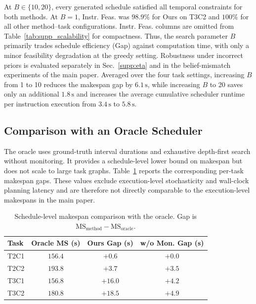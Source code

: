 \documentclass[letterpaper,10pt,onecolumn]{IEEEtran}
\begin{document}
At $B \in \{10,20\}$, every generated schedule satisfied all temporal constraints for both methods. At $B=1$, Instr. Feas. was $98.9\%$ for Ours on T3C2 and $100\%$ for all other method--task configurations. Instr. Feas. columns are omitted from Table~\ref{tab:supp_scalability} for compactness. Thus, the search parameter $B$ primarily trades schedule efficiency (Gap) against computation time, with only a minor feasibility degradation at the greedy setting. Robustness under incorrect priors is evaluated separately in Sec.~\ref{supp:eta} and in the belief-mismatch experiments of the main paper. Averaged over the four task settings, increasing $B$ from 1 to 10 reduces the makespan gap by $6.1\,\mathrm{s}$, while increasing $B$ to 20 saves only an additional $1.8\,\mathrm{s}$ and increases the average cumulative scheduler runtime per instruction execution from $3.4\,\mathrm{s}$ to $5.8\,\mathrm{s}$.

\subsection{Comparison with an Oracle Scheduler}\label{supp:oracle}

The oracle uses ground-truth interval durations and exhaustive
depth-first search without monitoring. It provides a schedule-level lower
bound on makespan but does not scale to large task graphs.
Table~\ref{tab:supp_oracle} reports the corresponding per-task makespan
gaps. These values exclude execution-level stochasticity and wall-clock
planning latency and are therefore not directly comparable to the
execution-level makespans in the main paper.

\begin{table}[H]
\centering
\caption{Schedule-level makespan comparison with the oracle.
Gap is $\mathrm{MS}_{\mathrm{method}}-\mathrm{MS}_{\mathrm{oracle}}$.}
\label{tab:supp_oracle}
{\small
\begin{tabular}{@{}lccc@{}}
\toprule
\textbf{Task} & \textbf{Oracle MS (s)} & \textbf{Ours Gap (s)} & \textbf{w/o Mon. Gap (s)} \\
\midrule
T2C1 & $156.4$ & $+0.6$ & $+0.0$ \\
T2C2 & $193.8$ & $+3.7$ & $+3.5$ \\
T3C1 & $156.8$ & $+16.0$ & $+4.2$ \\
T3C2 & $180.8$ & $+18.5$ & $+4.9$ \\
\bottomrule
\end{tabular}
}
\end{table}
\end{document}
